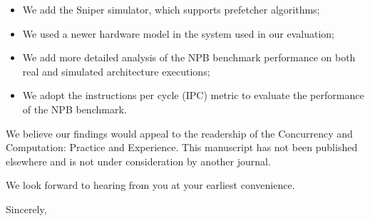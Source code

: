\documentclass{letter}
\begin{document}
\begin{letter}{}
\begin{itemize}
    \item We add the Sniper simulator, which supports prefetcher algorithms;

    \item We used a newer hardware model in the system used in our evaluation;

    \item We add  more detailed analysis of the NPB benchmark performance on both real and simulated architecture executions;

    \item We adopt the instructions per cycle (IPC) metric to evaluate the performance of the NPB benchmark.
\end{itemize}

We believe our findings would appeal to the readership of the Concurrency and Computation: Practice and Experience.
This manuscript has not been published elsewhere and is not under consideration by another journal.

We look forward to hearing from you at your earliest convenience.

\closing{Sincerely,}

\end{letter}
\end{document}
